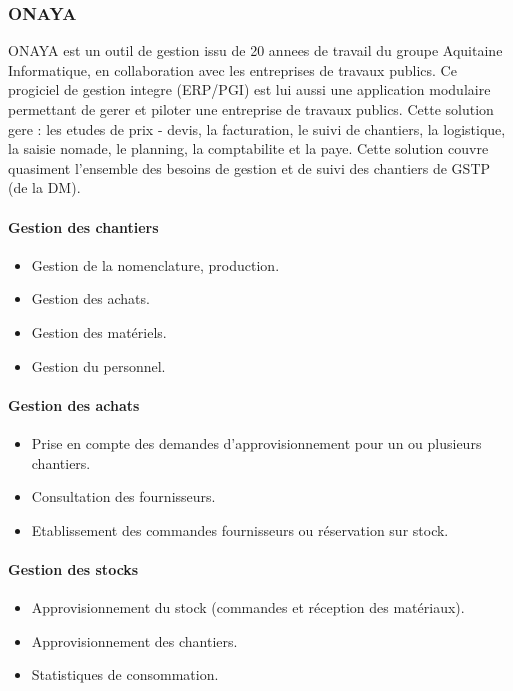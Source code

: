 		\subsubsection{ONAYA}
		ONAYA est un outil de gestion issu de 20 annees de travail du groupe Aquitaine Informatique, en collaboration avec les entreprises de travaux publics. Ce progiciel de gestion integre (ERP/PGI) est lui aussi une application modulaire permettant de gerer et piloter une entreprise de travaux publics. Cette solution gere : les etudes de prix - devis, la facturation, le suivi de chantiers, la
logistique, la saisie nomade, le planning, la comptabilite et la paye. Cette solution couvre quasiment l'ensemble des besoins de gestion et de suivi des chantiers de GSTP (de la DM).

				\paragraph{Gestion des chantiers}
				\begin{itemize}
				    \item Gestion de la nomenclature, production.
				    \item Gestion des achats.
				    \item Gestion des matériels.
				    \item Gestion du personnel.
				\end{itemize}
				
				\paragraph{Gestion des achats}
				\begin{itemize}
				    \item Prise en compte des demandes d'approvisionnement pour un ou plusieurs chantiers.
				    \item Consultation des fournisseurs.
				    \item Etablissement des commandes fournisseurs ou réservation sur stock.
				\end{itemize}
				
				\paragraph{Gestion des stocks}
				\begin{itemize}
				    \item Approvisionnement du stock (commandes et réception des matériaux).
				    \item Approvisionnement des chantiers.
				    \item Statistiques de consommation.
				\end{itemize}
				
